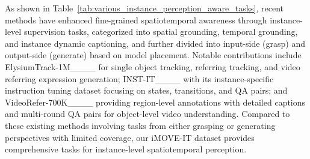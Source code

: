 As shown in Table~\ref{tab:various_instance_perception_aware_tasks}, recent methods have enhanced fine-grained spatiotemporal awareness through instance-level supervision tasks, categorized into spatial grounding, temporal grounding, and instance dynamic captioning, and further divided into input-side (grasp) and output-side (generate) based on model placement. Notable contributions include ElysiumTrack-1M____ for single object tracking, referring tracking, and video referring expression generation; INST-IT____ with its instance-specific instruction tuning dataset focusing on states, transitions, and QA pairs; and VideoRefer-700K____ providing region-level annotations with detailed captions and multi-round QA pairs for object-level video understanding. Compared to these existing methods involving tasks from either grasping or generating perspectives with limited coverage, 
our iMOVE-IT dataset provides comprehensive tasks for instance-level spatiotemporal perception.